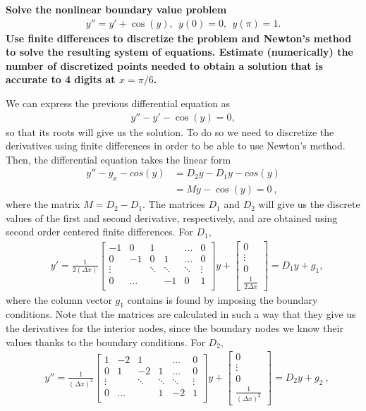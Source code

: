 \textbf{Solve the nonlinear boundary value problem}
\begin{align*}
y''=y'+\cos(y),~~y(0)=0,~~y(\pi)=1.
\end{align*}
\textbf{Use finite differences to discretize the problem and Newton’s method to solve the resulting system of equations. Estimate (numerically) the number of discretized points needed to obtain a solution that is accurate to 4 digits at $x = \pi/6$.}

We can express the previous differential equation as
\begin{align*}
y''-y'-\cos(y)=0,
\end{align*}
so that its roots will give us the solution. To do so we need to discretize the derivatives using finite differences in order to be able to use Newton's method. Then, the differential equation takes the linear form
\begin{align*}
y'' - y_x - cos(y) &= D_2y - D_1y - cos(y)\\
&=My-\cos(y) =0~,
\end{align*}
where the matrix $M = D_2 - D_1$. The matrices $D_1$ and $D_2$ will give us the discrete values of the first and second derivative, respectively, and are obtained using second order centered finite differences. For $D_1$,
\begin{align*}
&y' = \frac{1}{2(\Delta x)}
\begin{bmatrix}
-1 & 0 & 1 & ~&  \dots & 0 \\
0 & -1 & 0 & 1 & \dots & 0 \\ 
\vdots & ~&  \ddots & \ddots & \ddots & \vdots \\
0 & \dots & ~ & -1 & 0 & 1 \\
\end{bmatrix}y +
\begin{bmatrix}
0 \\
\vdots \\
0 \\
\frac{1}{2 \Delta x}
\end{bmatrix} = D_1y + g_1,
\end{align*}
where the column vector $g_1$ contains is found by imposing the boundary conditions. Note that the matrices are calculated in such a way that they give us the derivatives for the interior nodes, since the boundary nodes we know their values thanks to the boundary conditions. For $D_2$,
\begin{align*}
& y'' = \frac{1}{(\Delta x)^2} \begin{bmatrix}
1 & -2 & 1 & ~&  \dots & 0 \\
0 & 1 & -2 & 1 & \dots & 0 \\ 
\vdots & ~&  \ddots & \ddots & \ddots & \vdots \\
0 & \dots & ~ & 1 & -2 & 1 \\
\end{bmatrix}y + \begin{bmatrix}
0 \\
\vdots \\
0 \\
\frac{1}{( \Delta x)^2}
\end{bmatrix} = D_2y + g_2~,
\end{align*}
